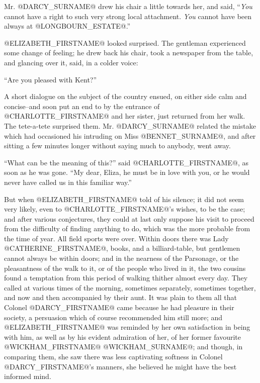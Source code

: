 Mr. @DARCY_SURNAME@ drew his chair a little towards her, and said, ``\textit{You} cannot
have a right to such very strong local attachment. \textit{You} cannot have
been always at @LONGBOURN_ESTATE@.''

@ELIZABETH_FIRSTNAME@ looked surprised. The gentleman experienced some change of
feeling; he drew back his chair, took a newspaper from the table, and
glancing over it, said, in a colder voice:

``Are you pleased with Kent?''

A short dialogue on the subject of the country ensued, on either side
calm and concise--and soon put an end to by the entrance of @CHARLOTTE_FIRSTNAME@
and her sister, just returned from her walk. The tete-a-tete surprised
them. Mr. @DARCY_SURNAME@ related the mistake which had occasioned his intruding
on Miss @BENNET_SURNAME@, and after sitting a few minutes longer without saying
much to anybody, went away.

``What can be the meaning of this?'' said @CHARLOTTE_FIRSTNAME@, as soon as he was
gone. ``My dear, Eliza, he must be in love with you, or he would never
have called us in this familiar way.''

But when @ELIZABETH_FIRSTNAME@ told of his silence; it did not seem very likely,
even to @CHARLOTTE_FIRSTNAME@'s wishes, to be the case; and after various
conjectures, they could at last only suppose his visit to proceed from
the difficulty of finding anything to do, which was the more probable
from the time of year. All field sports were over. Within doors there
was Lady @CATHERINE_FIRSTNAME@, books, and a billiard-table, but gentlemen cannot
always be within doors; and in the nearness of the Parsonage, or the
pleasantness of the walk to it, or of the people who lived in it, the
two cousins found a temptation from this period of walking thither
almost every day. They called at various times of the morning, sometimes
separately, sometimes together, and now and then accompanied by their
aunt. It was plain to them all that Colonel @DARCY_FIRSTNAME@ came because he
had pleasure in their society, a persuasion which of course recommended
him still more; and @ELIZABETH_FIRSTNAME@ was reminded by her own satisfaction in
being with him, as well as by his evident admiration of her, of her
former favourite @WICKHAM_FIRSTNAME@ @WICKHAM_SURNAME@; and though, in comparing them, she saw
there was less captivating softness in Colonel @DARCY_FIRSTNAME@'s manners,
she believed he might have the best informed mind.

